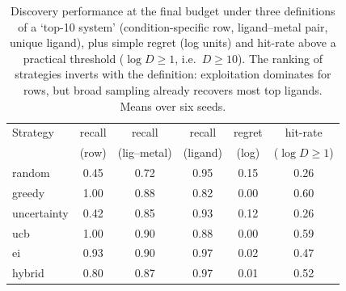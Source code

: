 \begin{table}[htbp]
\centering
\caption{Discovery performance at the final budget under three definitions of a `top-10 system' (condition-specific row, ligand--metal pair, unique ligand), plus simple regret (log units) and hit-rate above a practical threshold ($\log D\ge 1$, i.e.\ $D\ge 10$). The ranking of strategies inverts with the definition: exploitation dominates for rows, but broad sampling already recovers most top ligands. Means over six seeds.}
\label{tab:recall}
\begin{tabular}{lccccc}
\toprule
Strategy & recall & recall & recall & regret & hit-rate \\
 & (row) & (lig--metal) & (ligand) & (log) & ($\log D\!\ge\!1$) \\
\midrule
random & 0.45 & 0.72 & 0.95 & 0.15 & 0.26 \\
greedy & 1.00 & 0.88 & 0.82 & 0.00 & 0.60 \\
uncertainty & 0.42 & 0.85 & 0.93 & 0.12 & 0.26 \\
ucb & 1.00 & 0.90 & 0.88 & 0.00 & 0.59 \\
ei & 0.93 & 0.90 & 0.97 & 0.02 & 0.47 \\
hybrid & 0.80 & 0.87 & 0.97 & 0.01 & 0.52 \\
\bottomrule
\end{tabular}
\end{table}

